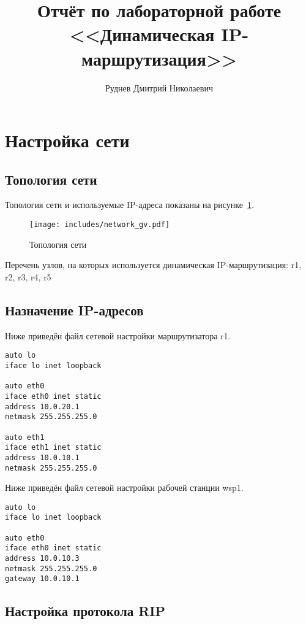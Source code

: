 \documentclass[a4paper,12pt]{article}
\title{Отчёт по лабораторной работе \\ <<Динамическая IP-маршрутизация>>}
\author{Руднев Дмитрий Николаевич}
\begin{document}
\maketitle

\tableofcontents

\section{Настройка сети}

\subsection{Топология сети}

Топология сети и используемые IP-адреса показаны на рисунке~\ref{fig:network}.

\begin{figure}
\centering
\texttt{[image: includes/network\_gv.pdf]}
\caption{Топология сети}
\label{fig:network}
\end{figure}

Перечень узлов, на которых используется динамическая IP-маршрутизация: r1, r2, r3, r4, r5


\subsection{Назначение IP-адресов}

Ниже приведён файл сетевой настройки  маршрутизатора r1.

\begin{Verbatim}
auto lo
iface lo inet loopback

auto eth0
iface eth0 inet static
address 10.0.20.1
netmask 255.255.255.0

auto eth1
iface eth1 inet static
address 10.0.10.1
netmask 255.255.255.0
\end{Verbatim}

Ниже приведён файл сетевой настройки рабочей станции wsp1.

\begin{Verbatim}
auto lo
iface lo inet loopback

auto eth0
iface eth0 inet static
address 10.0.10.3
netmask 255.255.255.0
gateway 10.0.10.1
\end{Verbatim}



\subsection{Настройка протокола RIP}
\end{document}
